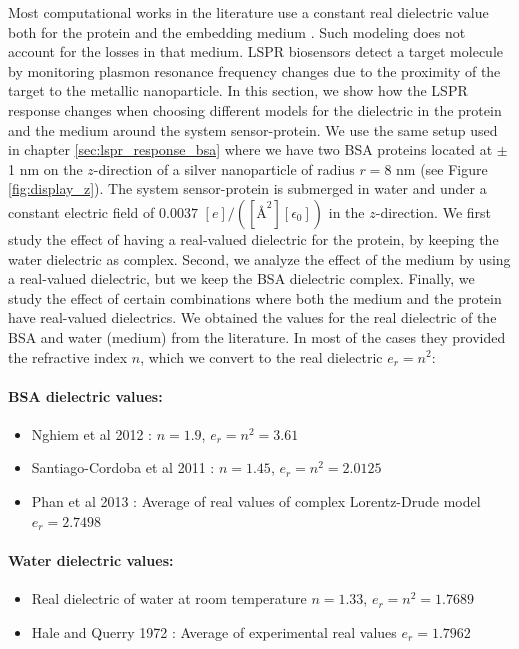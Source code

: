 Most computational works in the literature use a constant real dielectric value both for the protein and the
embedding medium \cite{NghiemETal2012, SantiagoCordobaETal2011,UngerETal2009}. Such modeling does not account for the losses 
in that medium. LSPR biosensors detect a target molecule by monitoring plasmon resonance frequency changes due to the proximity 
of the target to the metallic nanoparticle. In this section, we show how the LSPR response changes when choosing different models 
for the dielectric in the protein and the medium around the system sensor-protein. We use the same setup used in chapter \ref{sec:lspr_response_bsa}
where we have two BSA proteins located at $\pm$ 1 nm on the $z$-direction of a silver nanoparticle of radius $r=8$ nm (see 
Figure \ref{fig:display_z}). The system sensor-protein is submerged in water and under a constant electric field of 
$0.0037$ $[e]/([{\text{\AA}}^2][\epsilon_0])$ in the $z$-direction. We first study the effect of having a real-valued dielectric 
for the protein, by keeping the water dielectric as complex. Second, we analyze the effect of the medium by using a real-valued 
dielectric, but we keep the BSA dielectric complex. Finally, we study the effect of certain combinations where both the medium 
and the protein have real-valued dielectrics. We obtained the values for the real dielectric of the BSA and water (medium) from the literature.
In most of the cases they provided the refractive index $n$, which we convert to the real dielectric $e_r=n^2$:  

\paragraph{BSA dielectric values:}
\begin{itemize}
    \item {Nghiem et al 2012 \cite{NghiemETal2012}: $n=1.9$, $e_r = n^2 = 3.61$}
    \item {Santiago-Cordoba et al 2011 \cite{SantiagoCordobaETal2011}: $n=1.45$, $e_r = n^2 = 2.0125$}
    \item {Phan et al 2013 \cite{PhanETal2013}: Average of real values of complex Lorentz-Drude model $e_r = 2.7498$}
\end{itemize}

\paragraph{Water dielectric values:}
\begin{itemize}
    \item {Real dielectric of water at room temperature $n=1.33$, $e_r = n^2 = 1.7689$}
    \item {Hale and Querry 1972 \cite{HaleQuerry1972}: Average of experimental real values $e_r = 1.7962$}
\end{itemize}
  
